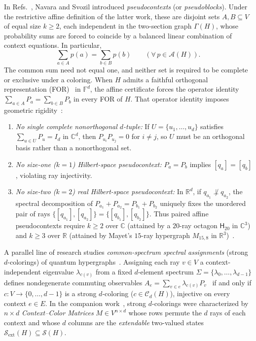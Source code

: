 \documentclass[aps,pra,reprint,superscriptaddress,longbibliography,nofootinbib,floatfix,10pt]{revtex4-2}
\theoremstyle{definition}\newtheorem{definition}[theorem]{Definition}
\theoremstyle{remark}\newtheorem{remark}[theorem]{Remark}
\newcommand{\C}{\mathbb C}\newcommand{\R}{\mathbb R}\newcommand{\Q}{\mathbb Q}
\newcommand{\F}{\mathbb F}\newcommand{\Z}{\mathbb Z}\newcommand{\PP}{\mathbb P}
\newcommand{\Sc}{\mathcal S}\newcommand{\Cc}{\mathcal C}\newcommand{\Wc}{\mathcal W}
\newcommand{\Htwenty}{\mathsf H_{20}}
\begin{document}
In Refs.~\cite{2023-navara-svozil,2026-Navara-Svozil-pseudocontexts}, Navara and Svozil introduced \emph{pseudocontexts} (or \emph{pseudoblocks}). Under the restrictive affine definition of the latter work, these are disjoint sets $A,B\subseteq V$ of equal size $k\ge2$, each independent in the two-section graph $\Gamma(H)$, whose probability sums are forced to coincide by a balanced linear combination of context equations. In particular,
\begin{equation}\label{eq:paired-sum}
\sum_{a\in A} p(a) = \sum_{b\in B} p(b) \qquad (\forall\, p\in\mathcal A(H)).
\end{equation}
The common sum need not equal one, and neither set is required to be complete or exclusive under a coloring. When $H$ admits a faithful orthogonal representation (FOR)~\cite{lovasz-79,Portillo-2015} in $\F^d$, the affine certificate forces the operator identity $\sum_{a\in A}P_a=\sum_{b\in B}P_b$ in every FOR of $H$. That operator identity imposes geometric rigidity~\cite{2026-Navara-Svozil-pseudocontexts,2026-Navara-Svozil-complex-only-3d-hypergraphs}:
\begin{enumerate}
\item \emph{No single complete nonorthogonal $d$-tuple:} If $U=\{u_1,\ldots,u_d\}$ satisfies $\sum_{u\in U}P_u=I_d$ in $\C^d$, then $P_{u_i}P_{u_j}=0$ for $i\neq j$, so $U$ must be an orthogonal basis rather than a nonorthogonal set.
\item \emph{No size-one ($k=1$) Hilbert-space pseudocontext:} $P_a=P_b$ implies $[q_a]=[q_b]$, violating ray injectivity.
\item \emph{No size-two ($k=2$) real Hilbert-space pseudocontext:} In $\R^d$, if $q_{a_1}\not\perp q_{a_2}$, the spectral decomposition of $P_{a_1}+P_{a_2}=P_{b_1}+P_{b_2}$ uniquely fixes the unordered pair of rays $\{[q_{a_1}],[q_{a_2}]\}=\{[q_{b_1}],[q_{b_2}]\}$. Thus paired affine pseudocontexts require $k\ge 2$ over $\C$ (attained by a $20$-ray octagon $\Htwenty$ in $\C^3$) and $k\ge 3$ over $\R$ (attained by Mayet's $15$-ray hypergraph $M_{15,8}$ in $\R^3$)~\cite{2026-Navara-Svozil-pseudocontexts}.
\end{enumerate}

A parallel line of research studies \emph{common-spectrum spectral assignments} (strong $d$-colorings) of quantum hypergraphs~\cite{svozil-2020-c,svozil-2021-chroma,svozil-2026-chromaticcoordinatization,2026-latin-context-matrix}. Assigning each ray $v\in V$ a context-independent eigenvalue $\lambda_{c(v)}$ from a fixed $d$-element spectrum $\Sigma=\{\lambda_0,\ldots,\lambda_{d-1}\}$ defines nondegenerate commuting observables $A_e=\sum_{v\in e}\lambda_{c(v)}P_v$~\cite{v-neumann-31,halmos-vs} if and only if $c:V\to\{0,\ldots,d-1\}$ is a strong $d$-coloring ($c\in\Cc_d(H)$), injective on every context $e\in E$. In the companion work~\cite{2026-latin-context-matrix}, strong $d$-colorings were characterized by $n\times d$ \emph{Context--Color Matrices} $M\in V^{n\times d}$ whose rows permute the $d$ rays of each context and whose $d$ columns are the \emph{extendable} two-valued states $\Sc_{\mathrm{ext}}(H)\subseteq\Sc(H)$.
\end{document}
